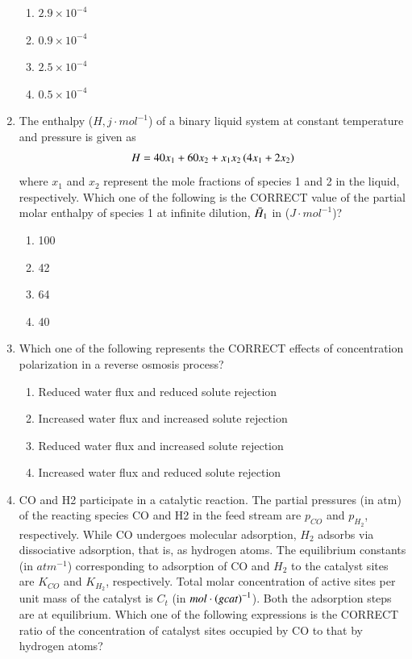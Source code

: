 \documentclass[journal,12pt,onecolumn]{IEEEtran}
\theoremstyle{remark}
\begin{document}
\begin{enumerate}
    \hfill{}
    \begin{enumerate}
        \item $2.9 \times 10^{-4}$
        \item $0.9 \times 10^{-4}$
        \item $2.5 \times 10^{-4}$
        \item $0.5 \times 10^{-4}$
    \end{enumerate}

    \item The enthalpy ($H, j\cdot mol^{-1}$) of a binary liquid system at constant temperature and pressure is given as
    \begin{align*}
        H = 40x_1 + 60x_2 + x_1x_2\left(4x_1 + 2x_2\right)
    \end{align*}
    where $x_1$ and $x_2$ represent the mole fractions of species 1 and 2 in the liquid, respectively. Which one of the following is the CORRECT value of the partial molar enthalpy of species 1 at infinite dilution, $\Bar{H}_{1}$ in ($J\cdot mol^{-1}$)?

    \hfill{}
    \begin{enumerate}
        \item 100
        \item 42
        \item 64
        \item 40
    \end{enumerate}

    \item Which one of the following represents the CORRECT effects of concentration polarization in a reverse osmosis process?

    \hfill{}
    \begin{enumerate}
        \item Reduced water flux and reduced solute rejection
        \item Increased water flux and increased solute rejection
        \item Reduced water flux and increased solute rejection
        \item Increased water flux and reduced solute rejection
    \end{enumerate}
    \newpage
   \item CO and H2 participate in a catalytic reaction. The partial pressures (in atm) of the reacting species CO and H2 in the feed stream are $p_{CO}$ and $p_{H_2}$, respectively. While CO undergoes molecular adsorption, $H_2$ adsorbs via dissociative adsorption, that is, as hydrogen atoms. The equilibrium constants (in $atm^{-1}$) corresponding to adsorption of CO and $H_2$ to the catalyst sites are $K_{CO}$ and $K_{H_2}$, respectively. Total molar concentration of active sites per unit mass of the catalyst is $C_t$ (in $mol\cdot \left(g cat\right)^{-1}$). Both the adsorption steps are at equilibrium. Which one of the following expressions is the CORRECT ratio of the concentration of catalyst sites occupied by CO to that by hydrogen atoms?


\end{enumerate}
\end{document}
